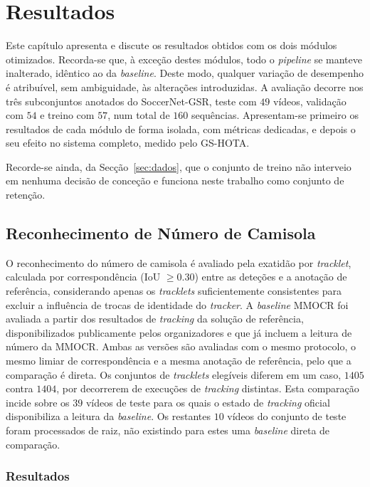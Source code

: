 \chapter{Resultados}\label{cap:resultados}

Este capítulo apresenta e discute os resultados obtidos com os dois módulos otimizados. Recorda-se que, à exceção destes módulos, todo o \emph{pipeline} se manteve inalterado, idêntico ao da \emph{baseline}. Deste modo, qualquer variação de desempenho é atribuível, sem ambiguidade, às alterações introduzidas. A avaliação decorre nos três subconjuntos anotados do SoccerNet-GSR, teste com $49$ vídeos, validação com $54$ e treino com $57$, num total de $160$ sequências. Apresentam-se primeiro os resultados de cada módulo de forma isolada, com métricas dedicadas, e depois o seu efeito no sistema completo, medido pelo GS-HOTA.

Recorde-se ainda, da Secção~\ref{sec:dados}, que o conjunto de treino não interveio em nenhuma decisão de conceção e funciona neste trabalho como conjunto de retenção.

\section{Reconhecimento de Número de Camisola}

O reconhecimento do número de camisola é avaliado pela exatidão por \emph{tracklet}, calculada por correspondência (IoU $\geq 0.30$) entre as deteções e a anotação de referência, considerando apenas os \emph{tracklets} suficientemente consistentes para excluir a influência de trocas de identidade do \emph{tracker}. A \emph{baseline} MMOCR foi avaliada a partir dos resultados de \emph{tracking} da solução de referência, disponibilizados publicamente pelos organizadores e que já incluem a leitura de número da MMOCR. Ambas as versões são avaliadas com o mesmo protocolo, o mesmo limiar de correspondência e a mesma anotação de referência, pelo que a comparação é direta. Os conjuntos de \emph{tracklets} elegíveis diferem em um caso, $1405$ contra $1404$, por decorrerem de execuções de \emph{tracking} distintas. Esta comparação incide sobre os $39$ vídeos de teste para os quais o estado de \emph{tracking} oficial disponibiliza a leitura da \emph{baseline}. Os restantes $10$ vídeos do conjunto de teste foram processados de raiz, não existindo para estes uma \emph{baseline} direta de comparação.

\subsection{Resultados}

